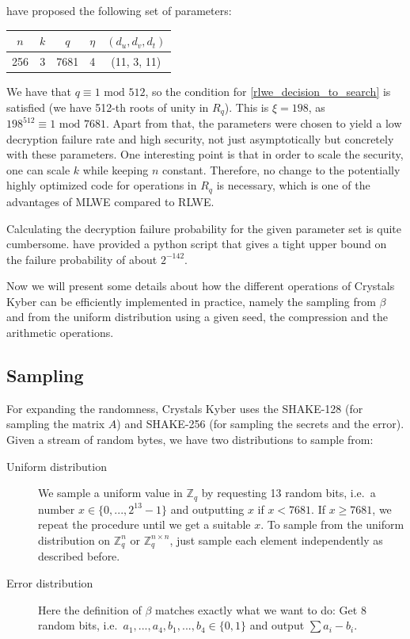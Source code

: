\documentclass{report}
\newcommand{\Z}{\mathbb{Z}}
\renewcommand{\mod}{\text{ mod }}
\begin{document}
\cite{Kyber} have proposed the following set of parameters:
\begin{center}
\centering
\begin{tabular}{ c c c c c }
\hline
$n$ & $k$ & $q$ & $\eta$ & $(d_u, d_v, d_t)$ \\
\hline
256 & 3 & 7681 & 4 & (11, 3, 11) \\
\hline
\end{tabular}
\end{center}
We have that $q \equiv 1 \mod 512$, so the condition for \ref{rlwe_decision_to_search} is satisfied (we have 512-th roots of unity in $R_q$). This is $\xi = 198$, as $198^{512} \equiv 1 \mod 7681$. Apart from that, the parameters were chosen to yield a low decryption failure rate and high security, not just asymptotically but concretely with these parameters. One interesting point is that in order to scale the security, one can scale $k$ while keeping $n$ constant. Therefore, no change to the potentially highly optimized code for operations in $R_q$ is necessary, which is one of the advantages of MLWE compared to RLWE.

Calculating the decryption failure probability for the given parameter set is quite cumbersome. \cite{Kyber} have provided a python script that gives a tight upper bound on the failure probability of about $2^{-142}$.

Now we will present some details about how the different operations of Crystals Kyber can be efficiently implemented in practice, namely the sampling from $\beta$ and from the uniform distribution using a given seed, the compression and the arithmetic operations.

\subsection{Sampling}
For expanding the randomness, Crystals Kyber uses the SHAKE-128 (for sampling the matrix $A$) and SHAKE-256 (for sampling the secrets and the error). Given a stream of random bytes, we have two distributions to sample from:
\begin{description}
\item[Uniform distribution] We sample a uniform value in $\Z_q$ by requesting 13 random bits, i.e.\ a number $x \in \{ 0, ..., 2^{13} - 1 \}$ and outputting $x$ if $x < 7681$. If $x \geq 7681$, we repeat the procedure until we get a suitable $x$. To sample from the uniform distribution on $\Z_q^n$ or $\Z_q^{n \times n}$, just sample each element independently as described before.
\item[Error distribution] Here the definition of $\beta$ matches exactly what we want to do: Get 8 random bits, i.e.\ $a_1, ..., a_4, b_1, ..., b_4 \in \{ 0, 1 \}$ and output $\sum a_i - b_i$.
\end{description}
\end{document}
